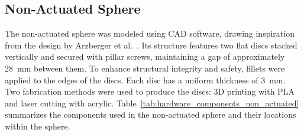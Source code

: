 \documentclass[a4paper, conference]{IEEEtran}
\begin{document}
\subsection{Non-Actuated Sphere}
The non-actuated sphere was modeled using CAD software, drawing inspiration from the design by Arzberger et al.~\cite{Kalman_filter_sphere}.
Its structure features two flat discs stacked vertically and secured with pillar screws, maintaining a gap of approximately \SI{28}{\milli\meter} between them. 
To enhance structural integrity and safety, fillets were applied to the edges of the discs. 
Each disc has a uniform thickness of \SI{3}{\milli\meter}.
Two fabrication methods were used to produce the discs: 3D printing with PLA and laser cutting with acrylic. 
Table~\ref{tab:hardware_components_non_actuated} summarizes the components used in the non-actuated sphere and their locations within the sphere.
\end{document}
